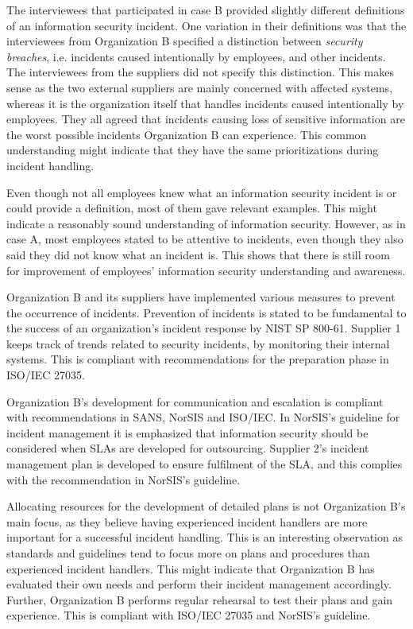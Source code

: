 The interviewees that participated in case B provided slightly different definitions of an information security incident. One variation in their definitions was that the interviewees from Organization B specified a distinction between \textit{security breaches}, i.e. incidents caused intentionally by employees, and other incidents. The interviewees from the suppliers did not specify this distinction. This makes sense as the two external suppliers are mainly concerned with affected systems, whereas it is the organization itself that handles incidents caused intentionally by employees. They all agreed that incidents causing loss of sensitive information are the worst possible incidents Organization B can experience. This common understanding might indicate that they have the same prioritizations during incident handling.

Even though not all employees knew what an information security incident is or could provide a definition, most of them gave relevant examples. This might indicate a reasonably sound understanding of information security. However, as in case A, most employees stated to be attentive to incidents, even though they also said they did not know what an incident is. This shows that there is still room for improvement of employees' information security understanding and awareness.

Organization B and its suppliers have implemented various measures to prevent the occurrence of incidents. Prevention of incidents is stated to be fundamental to the success of an organization's incident response by NIST SP 800-61. Supplier 1 keeps track of trends related to security incidents, by monitoring their internal systems. This is compliant with recommendations for the preparation phase in ISO/IEC 27035.

Organization B's development for communication and escalation is compliant with recommendations in SANS, NorSIS and ISO/IEC. In NorSIS's guideline for incident management it is emphasized that information security should be considered when \acp{SLA} are developed for outsourcing. Supplier 2's incident management plan is developed to ensure fulfilment of the \ac{SLA}, and this complies with the recommendation in NorSIS's guideline. 

Allocating resources for the development of detailed plans is not Organization B's main focus, as they believe having experienced incident handlers are more important for a successful incident handling. This is an interesting observation as standards and guidelines tend to focus more on plans and procedures than experienced incident handlers. This might indicate that Organization B has evaluated their own needs and perform their incident management accordingly. Further, Organization B performs regular rehearsal to test their plans and gain experience. This is compliant with ISO/IEC 27035 and NorSIS's guideline. 

